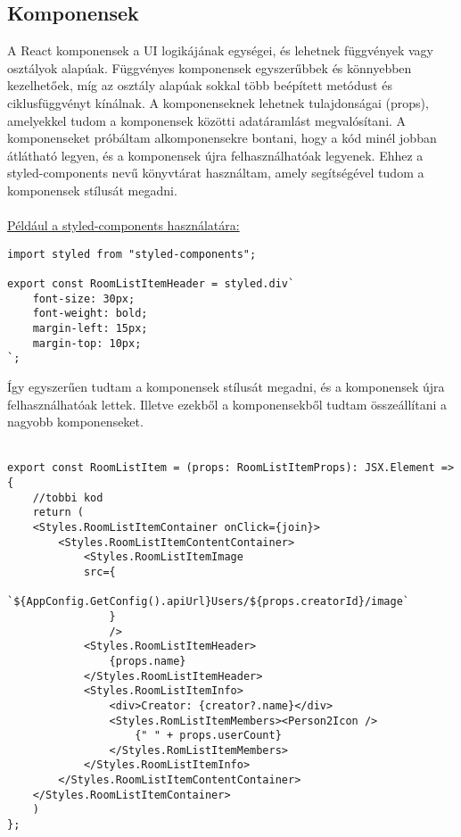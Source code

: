 \subsection*{Komponensek}
A React komponensek a UI logikájának egységei, és lehetnek függvények vagy osztályok alapúak. Függvényes komponensek egyszerűbbek és könnyebben kezelhetőek, míg az osztály alapúak sokkal több beépített metódust és ciklusfüggvényt kínálnak.
A komponenseknek lehetnek tulajdonságai (props), amelyekkel tudom a komponensek közötti adatáramlást megvalósítani.
A komponenseket próbáltam alkomponensekre bontani, hogy a kód minél jobban átlátható legyen, és a komponensek újra felhasználhatóak legyenek.
Ehhez a styled-components \cite[]{styled-components} nevű könyvtárat használtam, amely segítségével tudom a komponensek stílusát megadni.
\\
\\
\underline{Például a styled-components használatára:}
\begin{lstlisting}[style=es6,caption={Styled-components}]
import styled from "styled-components";

export const RoomListItemHeader = styled.div`
    font-size: 30px;
    font-weight: bold;
    margin-left: 15px;
    margin-top: 10px;
`;

\end{lstlisting}
\vspace{1em}
Így egyszerűen tudtam a komponensek stílusát megadni, és a komponensek újra felhasználhatóak lettek.
Illetve ezekből a komponensekből tudtam összeállítani a nagyobb komponenseket.
\\
\\
\begin{lstlisting}[style=es6,caption={RoomListItem komponens}]
export const RoomListItem = (props: RoomListItemProps): JSX.Element => {
    //tobbi kod
    return (
    <Styles.RoomListItemContainer onClick={join}>
        <Styles.RoomListItemContentContainer>
            <Styles.RoomListItemImage
            src={
            `${AppConfig.GetConfig().apiUrl}Users/${props.creatorId}/image`
                }
                />
            <Styles.RoomListItemHeader>
                {props.name}
            </Styles.RoomListItemHeader>
            <Styles.RoomListItemInfo>
                <div>Creator: {creator?.name}</div>
                <Styles.RomListItemMembers><Person2Icon />
                    {" " + props.userCount} 
                </Styles.RomListItemMembers>
            </Styles.RoomListItemInfo>
        </Styles.RoomListItemContentContainer>
    </Styles.RoomListItemContainer>
    )
};
\end{lstlisting}
\vspace{1em}
